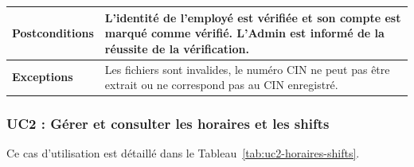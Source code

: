 \begin{longtable}{|>{\RaggedRight\arraybackslash}p{4cm}|>{\RaggedRight\arraybackslash}p{10.5cm}|}
\hline

\textbf{Postconditions} &
L'identité de l'employé est vérifiée et son compte est marqué comme vérifié. L'Admin est informé de la réussite de la vérification. \\

\hline

\textbf{Exceptions} &
Les fichiers sont invalides, le numéro CIN ne peut pas être extrait ou ne correspond pas au CIN enregistré. \\

\hline


\end{longtable}



\subsubsection{UC2 : Gérer et consulter les horaires et les shifts}
Ce cas d'utilisation est détaillé dans le Tableau~\ref{tab:uc2-horaires-shifts}.

